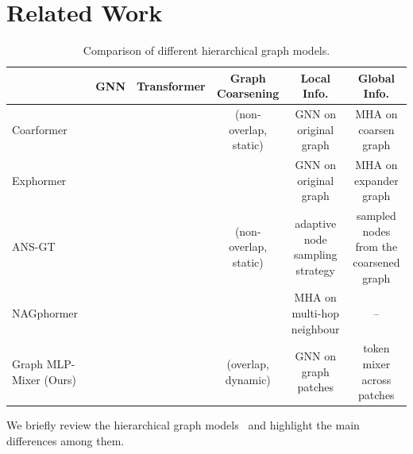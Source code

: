 \documentclass{article}
\newcommand{\cmark}{\ding{51}}%
\newcommand{\xmark}{\ding{55}}%
\begin{document}
\newpage




\newpage
\appendix

\section{Related Work}\label{app sec: related work}

\begin{table}[!ht]
    \centering
    \scriptsize
    \caption{Comparison of different hierarchical graph models. }
    \label{tab: related work}
    \begin{tabular}{lccccc}
    \toprule
         &  GNN  
         & Transformer 
         & Graph Coarsening 
         & Local Info. 
         & Global Info.\\
         \midrule
    Coarformer~\citep{kuang2022coarformer}     
    & \cmark 
    & \cmark
    & \cmark (non-overlap, static) 
    & GNN on original graph
    & MHA on coarsen graph \\
    Exphormer~\citep{shirzad2023exphormer}
    & \cmark
    & \cmark
    & \xmark
    & GNN on original graph	
    & MHA on expander graph\\
    ANS-GT~\citep{zhang2022hierarchical_ANSGT} 
    &  \xmark
    & \cmark
    & \cmark (non-overlap, static)
    & adaptive node sampling strategy	
    & sampled nodes from the coarsened graph\\
    NAGphormer~\citep{chen2022nagphormer}
    & \xmark
    & \cmark
    & \xmark
    & MHA on multi-hop neighbour
    & --\\
    Graph MLP-Mixer (Ours) 
    & \cmark
    & \cmark
    & \cmark (overlap, dynamic)	
    & GNN on graph patches	
    & token mixer across patches\\
    \bottomrule
    \end{tabular}
\end{table}




We briefly review the hierarchical graph models~\citep{kuang2022coarformer, shirzad2023exphormer, zhang2022hierarchical_ANSGT, chen2022nagphormer} and highlight the main differences among them.
\end{document}
